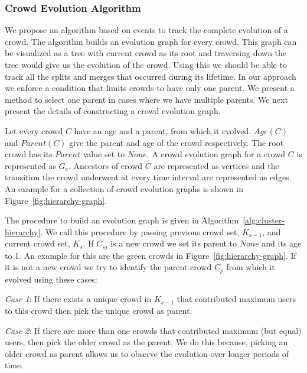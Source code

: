 \documentclass{sig-alternate}
\begin{document}
\subsubsection{Crowd Evolution Algorithm}
We propose an algorithm based on events to track the complete evolution of a
crowd. The algorithm builds an evolution graph for every crowd. This graph can be
visualized as a tree with current crowd as its root and traversing down the tree
would give us the evolution of the crowd. Using this we should be able to track
all the splits and merges that occurred during its lifetime.
In our approach we enforce a condition that limits crowds to
have only one parent. We present a method to select one parent in cases where we
have multiple parents. We next present the details of constructing a crowd
evolution graph.

Let every crowd $C$ have an age and a parent, from which it evolved.
$Age(C)$ and $Parent(C)$ give the parent and age of the crowd respectively. The
root crowd has its $Parent$ value set to $None$. A crowd evolution graph for a
crowd $C$ is represented as $G_e$. Ancestors of crowd $C$ are represented as
vertices and the transition the crowd underwent at every time interval are
represented as edges. An example for a collection of crowd evolution graphs is
shown in Figure~\ref{fig:hierarchy-graph}.

The procedure to build an evolution graph is given in
Algorithm~\ref{alg:cluster-hierarchy}. We call this procedure by passing previous
crowd set, $K_{s-1}$,  and current crowd set, $K_s$. If $C_{sj}$ is a new crowd
we set its parent to $None$ and its age to 1. An example for this are the green
crowds in Figure~\ref{fig:hierarchy-graph}. If it is not a new crowd we try to
identify the parent crowd $C_p$ from which it evolved using these cases:

\textit{Case 1}: If there exists a unique crowd in $K_{s-1}$ that
contributed maximum users to this crowd then pick the unique crowd as parent.

\textit{Case 2}: If there are more than one crowds that contributed maximum (but
equal) users, then pick the older crowd as the parent. We do this because,
picking an older crowd as parent allows us to observe the evolution over longer
periods of time.
\end{document}
